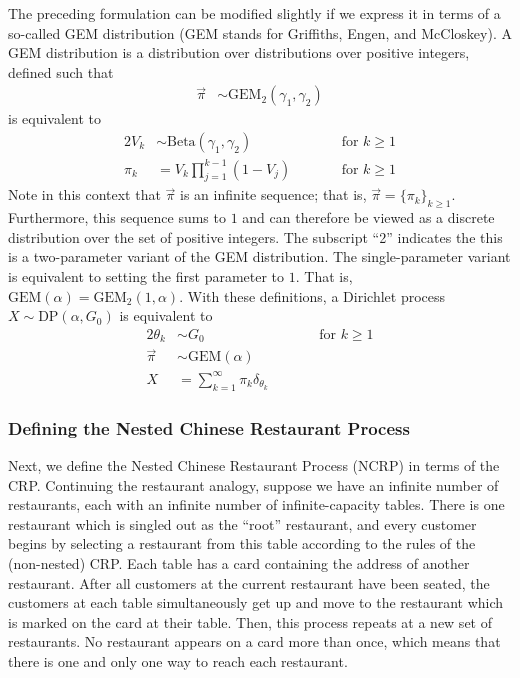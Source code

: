\documentclass{article}
\begin{document}
The preceding formulation can be modified slightly if we express it in terms of a so-called GEM distribution (GEM stands for Griffiths, Engen, and McCloskey).
A GEM distribution is a distribution over distributions over positive integers, defined such that
\begin{align}
\vec \pi &\sim \text{GEM}_2(\gamma_1, \gamma_2)
\end{align}
is equivalent to
\begin{alignat}{2}
V_k &\sim \text{Beta}(\gamma_1, \gamma_2) &\qquad& \text{for $k \geq 1$} \\
\pi_k &= V_k \prod_{j=1}^{k-1} (1 - V_j) &\qquad& \text{for $k \geq 1$}
\end{alignat}
Note in this context that $\vec \pi$ is an infinite sequence; that is, $\vec \pi = \{ \pi_k \}_{k \geq 1}$.
Furthermore, this sequence sums to $1$ and can therefore be viewed as a discrete distribution over the set of positive integers.
The subscript ``2'' indicates the this is a two-parameter variant of the GEM distribution.
The single-parameter variant is equivalent to setting the first parameter to $1$.
That is, $\text{GEM}(\alpha) = \text{GEM}_2(1, \alpha)$.
With these definitions, a Dirichlet process $X \sim \text{DP}(\alpha, G_0)$ is equivalent to
\begin{alignat}{2}
\theta_k &\sim G_0 &\qquad& \text{for $k \geq 1$} \\
\vec \pi &\sim \text{GEM}(\alpha) && \\
X &= \sum_{k=1}^\infty \pi_k \delta_{\theta_k} &&
\end{alignat}

\subsubsection{Defining the Nested Chinese Restaurant Process}

Next, we define the Nested Chinese Restaurant Process (NCRP) in terms of the CRP.
Continuing the restaurant analogy, suppose we have an infinite number of restaurants, each with an infinite number of infinite-capacity tables.
There is one restaurant which is singled out as the ``root'' restaurant, and every customer begins by selecting a restaurant from this table according to the rules of the (non-nested) CRP.
Each table has a card containing the address of another restaurant.
After all customers at the current restaurant have been seated, the customers at each table simultaneously get up and move to the restaurant which is marked on the card at their table.
Then, this process repeats at a new set of restaurants.
No restaurant appears on a card more than once, which means that there is one and only one way to reach each restaurant.
\end{document}
